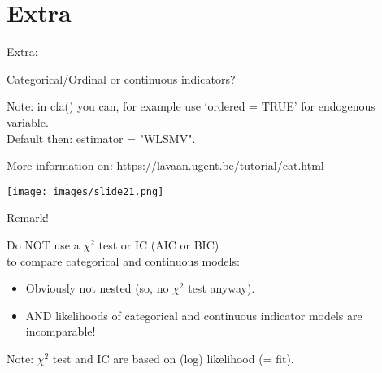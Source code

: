 \documentclass[10pt]{beamer}\usepackage[]{graphicx}\usepackage[]{xcolor}
\begin{document}
\section{Extra}

\begin{frame}
	
	\begin{center}
		\Huge{Extra:}
		
		\large{Categorical/Ordinal or continuous indicators?}
	\end{center}
	
	\vspace*{15mm}
	
	Note: in cfa() you can, for example use `ordered = TRUE' for  endogenous variable.\\
	Default then: estimator = "WLSMV".
	
	\vspace*{15mm}
	
	More information on: https://lavaan.ugent.be/tutorial/cat.html
	
\end{frame}

\begin{frame}
	
	\texttt{[image: images/slide21.png]}
	
\end{frame}


\begin{frame}{Remark!}
	
Do NOT use a $\chi^2$ test or IC (AIC or BIC) \\
to compare categorical and continuous models:

\vspace{5mm}

\begin{itemize}
	\item Obviously not nested (so, no $\chi^2$ test anyway).
	\item AND likelihoods of categorical and continuous indicator models are incomparable!
\end{itemize}
	
	\vspace{5mm}
	
	Note: $\chi^2$ test and IC are based on (log) likelihood (= fit).
	
\end{frame}
\end{document}

